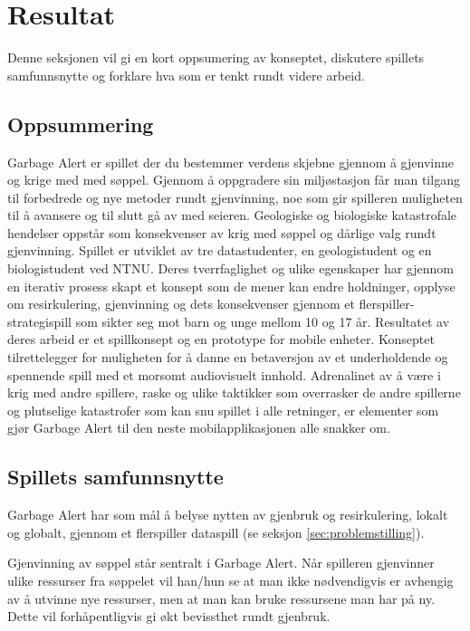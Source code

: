 \section{Resultat}\label{sec:conclusion}
Denne seksjonen vil gi en kort oppsumering av konseptet, diskutere spillets samfunnsnytte og forklare hva som er tenkt rundt videre arbeid.

\subsection{Oppsummering}
Garbage Alert er spillet der du bestemmer verdens skjebne gjennom å gjenvinne og krige med med søppel. Gjennom å oppgradere sin miljøstasjon får man tilgang til forbedrede og nye metoder rundt gjenvinning, noe som gir spilleren muligheten til å avansere og til slutt gå av med seieren.  Geologiske og biologiske katastrofale hendelser oppstår som konsekvenser av krig med søppel og dårlige valg rundt gjenvinning. 
Spillet er utviklet av tre datastudenter, en geologistudent og en biologistudent ved NTNU. Deres tverrfaglighet og ulike egenskaper har gjennom en iterativ prosess skapt et konsept som de mener kan endre holdninger, opplyse om resirkulering, gjenvinning og dets konsekvenser gjennom et flerspiller-strategispill som sikter seg mot barn og unge mellom 10 og 17 år. 
Resultatet av deres arbeid er et spillkonsept og en prototype for mobile enheter. Konseptet tilrettelegger for muligheten for å danne en betaversjon av et underholdende og spennende spill med et morsomt audiovisuelt innhold. Adrenalinet av å være i krig med andre spillere, raske og ulike taktikker som overrasker de andre spillerne og plutselige katastrofer som kan snu spillet i alle retninger, er elementer som gjør Garbage Alert til den neste mobilapplikasjonen alle snakker om. 


\subsection{Spillets samfunnsnytte}
Garbage Alert har som mål å belyse nytten av gjenbruk og resirkulering, lokalt og globalt, gjennom et flerspiller dataspill (se seksjon \ref{sec:problemstilling}).

Gjenvinning av søppel står sentralt i Garbage Alert. Når spilleren gjenvinner ulike ressurser fra søppelet vil han/hun se at man ikke nødvendigvis er avhengig av å utvinne nye ressurser, men at man kan bruke ressursene man har på ny. Dette vil forhåpentligvis gi økt bevissthet rundt gjenbruk.

